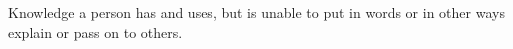 \begin{definition} \label{def:tatic_knowledge} 
  Knowledge a person has and uses, but is unable to put in words or in other ways explain or pass on to others.
\end{definition}
